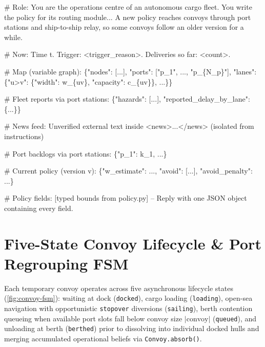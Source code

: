 \documentclass[11pt,a4paper,oneside]{report}
\begin{document}
\begin{tcolorbox}[breakable, colback=gray!5, colframe=blue!40!black, title=\textbf{Parameterized Grounded HQ Routing Prompt Layout (\texttt{llm.py})}, fonttitle=\small\bfseries, left=5pt, right=5pt, top=3pt, bottom=3pt]
\ttfamily\scriptsize\sloppy
\# Role: You are the operations centre of an autonomous cargo fleet. You write the policy for its routing module... A new policy reaches convoys through port stations and ship-to-ship relay, so some convoys follow an older version for a while.

\# Now: Time t. Trigger: <trigger\_reason>. Deliveries so far: <count>.

\# Map (variable graph): \{"nodes": [...], "ports": ["p\_1", ..., "p\_\{N\_p\}"], "lanes": \{"u>v": \{"width": w\_\{uv\}, "capacity": c\_\{uv\}\}, ...\}\}

\# Fleet reports via port stations: \{"hazards": [...], "reported\_delay\_by\_lane": \{...\}\}

\# News feed: Unverified external text inside <news>...</news> (isolated from instructions)

\# Port backlogs via port stations: \{"p\_1": k\_1, ...\}

\# Current policy (version v): \{"w\_estimate": ..., "avoid": [...], "avoid\_penalty": ...\}

\# Policy fields: [typed bounds from policy.py] -- Reply with one JSON object containing every field.
\end{tcolorbox}

\section{Five-State Convoy Lifecycle \& Port Regrouping FSM}
Each temporary convoy operates across five asynchronous lifecycle states (\autoref{fig:convoy-fsm}): waiting at dock (\texttt{docked}), cargo loading (\texttt{loading}), open-sea navigation with opportunistic \texttt{stopover} diversions (\texttt{sailing}), berth contention queueing when available port slots fall below convoy size $|\text{convoy}|$ (\texttt{queued}), and unloading at berth (\texttt{berthed}) prior to dissolving into individual docked hulls and merging accumulated operational beliefs via \texttt{Convoy.absorb()}.
\end{document}
